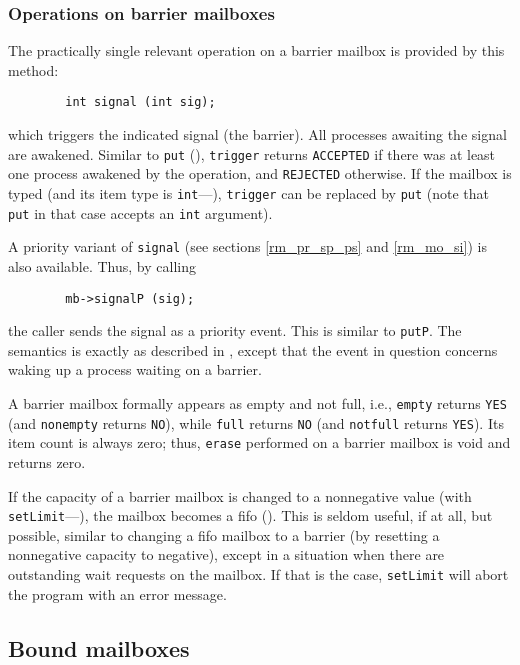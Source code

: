 \subsubsection{Operations on barrier mailboxes}
\label{rm_mb_ba_op}

The practically single relevant operation on a barrier mailbox is provided by
this method:
\begin{verbatim}
        int signal (int sig);
\end{verbatim}
which triggers the indicated signal (the barrier).
All processes awaiting the signal are awakened.
Similar to {\tt put} (), {\tt trigger} returns
{\tt ACCEPTED} if there was at least one process awakened by the operation,
and {\tt REJECTED} otherwise.
If the mailbox is typed (and its item type is {\tt int}---),
{\tt trigger} can be
replaced by {\tt put} (note that {\tt put} in that case
accepts an {\tt int} argument).

A priority variant of {\tt signal} (see sections \ref{rm_pr_sp_ps} and
\ref{rm_mo_si}) is also available.
Thus, by calling
\begin{verbatim}
        mb->signalP (sig);
\end{verbatim}
the caller sends the signal as a priority event.
This is similar to {\tt putP}.
The semantics is exactly as described in , except that the
event in question concerns waking up a process waiting on a barrier.

A barrier mailbox formally appears as empty and not full, i.e.,
{\tt empty} returns {\tt YES} (and {\tt nonempty} returns {\tt NO}),
while {\tt full} returns {\tt NO} (and {\tt notfull} returns {\tt YES}).
Its item count is always zero;
thus, {\tt erase} performed on a barrier mailbox is void and returns zero.

If the capacity of a barrier mailbox is changed to a nonnegative value
(with {\tt setLimit}---), the mailbox becomes a fifo
().
This is seldom useful, if at all, but
possible, similar to changing a fifo mailbox to a barrier
(by resetting a nonnegative capacity to negative), except
in a situation when there are outstanding wait requests on the mailbox.
If that is the case, {\tt setLimit} will abort the program with an error
message.

\subsection{Bound mailboxes}
\label{rm_mb_bo}


